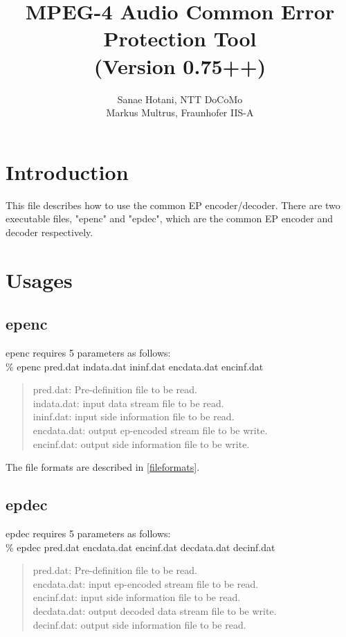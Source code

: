 \documentclass[a4paper]{article}
\begin{document}
 
\title{MPEG-4 Audio Common Error Protection Tool\\(Version 0.75++)}
\author{Sanae Hotani, NTT DoCoMo\\Markus Multrus, Fraunhofer IIS-A} 
\maketitle


\section{Introduction}

 This file describes how to use the common EP encoder/decoder.
 There are two executable files, "epenc" and "epdec", which are the common EP encoder and decoder respectively. 

\section{Usages}
\subsection{epenc}
  epenc requires 5 parameters as follows:\\

  \% epenc pred.dat indata.dat ininf.dat encdata.dat encinf.dat
\begin{quote}
  pred.dat:     Pre-definition file to be read.\\
  indata.dat:   input data stream file to be read.\\
  ininf.dat:    input side information file to be read.\\
  encdata.dat:  output ep-encoded stream file to be write.\\
  encinf.dat:   output side information file to be write.
\end{quote}

  The file formats are described in \ref{fileformats}.

\subsection{epdec}
  epdec requires 5 parameters as follows:\\

  \% epdec pred.dat encdata.dat encinf.dat decdata.dat decinf.dat
\begin{quote}
  pred.dat:     Pre-definition file to be read.\\
  encdata.dat:  input ep-encoded stream file to be read.\\
  encinf.dat:   input side information file to be read.\\
  decdata.dat:  output decoded data stream file to be write.\\
  decinf.dat:   output side information file to be read.
\end{quote}
\end{document}
